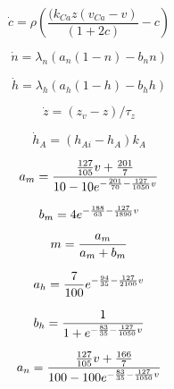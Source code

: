 \begin{equation} 
\dot{c}  = \rho(\frac{(k_{Ca}z(v_{Ca}-v)}{(1+2c)} - c)   \label{cdot}
\end{equation} 

\begin{equation} 
\dot{n}  = \lambda_n (a_n(1-n) - b_n n)    \label{ndot}
\end{equation} 

\begin{equation} 
\dot{h}  =  \lambda_h (a_h(1-h) - b_h h)   \label{hdot}
\end{equation} 

\begin{equation} 
\dot{z} = (z_v - z)/ \tau_{z}    \label{zdot}
\end{equation} 

\begin{equation} 
\dot{h}_A  =  (h_{Ai} - h_A) k_A   \label{hadot}
\end{equation} 

\begin{equation}
a_m = \frac{\frac{127}{105}v + \frac{201}{7}}{10-10 
     e^{-\frac{201}{70}-\frac{127}{1050}v}}    \label{am} \\
\end{equation}
 
\begin{equation}
b_m = 4e^{-\frac{188}{63}-\frac{127}{1890}v} \label{bm}  \\
\end{equation}

\begin{equation}
m = \frac{a_m}{a_m+b_m}  \label{m}  \\
\end{equation}

\begin{equation}
a_h = \frac{7}{100} e^{-\frac{94}{35}-\frac{127}{2100}v}   \label{ah} \\
\end{equation}

\begin{equation}
b_h = \frac{1}{1+e^{-\frac{83}{35}-\frac{127}{1050}v}}  \label{bh}  \\
\end{equation}

\begin{equation}
a_n = \frac{\frac{127}{105}v+\frac{166}{7}}{100-100 
     e^{-\frac{83}{35}-\frac{127}{1050}v}}  \label{an}  \\
\end{equation}

